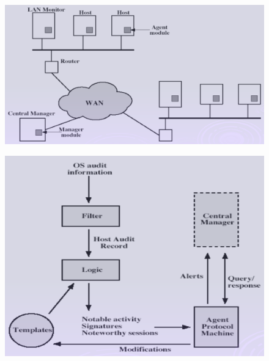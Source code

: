 \documentclass[11pt, a4paper, twoside, italian]{report}
\theoremstyle{plain}
\begin{document}
\begin{multicols}{2}
	\begin{figure}[H]
		\centering
		\includegraphics[scale=0.4]{dis}
	\end{figure}
\columnbreak
\begin{figure}[H]
	\centering
	\includegraphics[scale=0.42]{disagent}
\end{figure}
\end{multicols}
\end{document}
